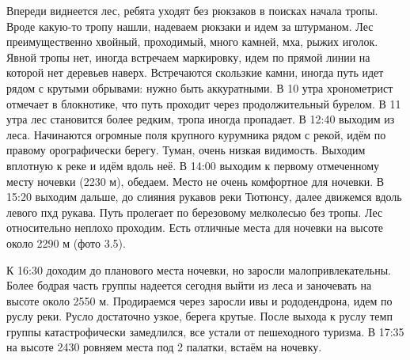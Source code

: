 Впереди виднеется лес, ребята уходят без рюкзаков в поисках начала тропы. Вроде какую-то тропу нашли, надеваем рюкзаки и идем за штурманом. Лес преимущественно хвойный, проходимый, много камней, мха, рыжих иголок. Явной тропы нет, иногда встречаем маркировку, идем по прямой линии на которой нет деревьев наверх. Встречаются скользкие камни, иногда путь идет рядом с крутыми обрывами: нужно быть аккуратными. В 10 утра хронометрист отмечает в блокнотике, что путь проходит через продолжительный бурелом. В 11 утра лес становится более редким, тропа иногда пропадает. В 12:40 выходим из леса. Начинаются огромные поля крупного курумника рядом с рекой, идём по правому орографически берегу. Туман, очень низкая видимость. Выходим вплотную к реке и идём вдоль неё. В 14:00 выходим к первому отмеченному месту ночевки (2230 м), обедаем. Место не очень комфортное для ночевки. В 15:20 выходим дальше, до слияния рукавов реки Тютюнсу, далее движемся вдоль левого пхд рукава. Путь пролегает по березовому мелколесью без тропы. Лес относительно неплохо проходим. Есть отличные места для ночевки на высоте около 2290 м (фото 3.5).

К 16:30 доходим до планового места ночевки, но заросли малопривлекательны. Более бодрая часть группы надеется сегодня выйти из леса и заночевать на высоте около 2550 м. Продираемся через заросли ивы и рододендрона, идем по руслу реки. Русло достаточно узкое, берега крутые. После выхода к руслу темп группы катастрофически замедлился, все устали от пешеходного туризма. В 17:35 на высоте 2430 ровняем места под 2 палатки, встаём на ночевку.















    \FloatBarrier
